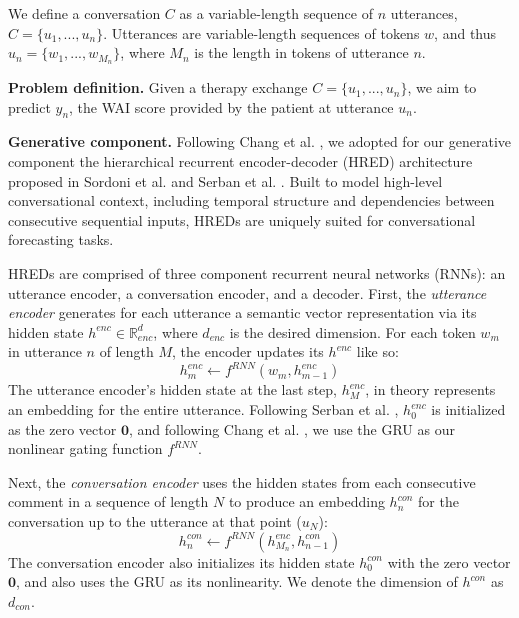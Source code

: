 \documentclass{article}
\begin{document}

We define a conversation $C$ as a variable-length sequence of $n$ utterances, $C=\{u_1,...,u_n\}$. Utterances are variable-length sequences of tokens $w$, and thus $u_n=\{w_1,...,w_{M_n}\}$, where $M_n$ is the length in tokens of utterance $n$.

\textbf{Problem definition.} Given a therapy exchange $C=\{u_1,...,u_n\}$, we aim to predict $y_n$, the WAI score provided by the patient at utterance $u_n$.




\textbf{Generative component.} Following Chang et al. \citeyear{Chang-Trouble:19}, we adopted for our generative component the hierarchical recurrent encoder-decoder (HRED) architecture proposed in Sordoni et al. \citeyear{sordoni2015hierarchical} and Serban et al. \citeyear{serban2016building}. Built to model high-level conversational context, including temporal structure and dependencies between consecutive sequential inputs, HREDs are uniquely suited for conversational forecasting tasks. 

HREDs are comprised of three component recurrent neural networks (RNNs): an utterance encoder, a conversation encoder, and a decoder. First, the \textit{utterance encoder} generates for each utterance a semantic vector representation via its hidden state $h^{enc} \in \mathbb{R}^d_{enc}$, where $d_{enc}$ is the desired dimension. For each token $w_m$ in utterance $n$ of length $M$, the encoder updates its $h^{enc}$ like so:
\begin{equation}
  h^{enc}_m \gets f^{RNN}(w_{m}, h^{enc}_{m-1})
\end{equation}
The utterance encoder's hidden state at the last step, $h^{enc}_{M}$, in theory represents an embedding for the entire utterance. Following Serban et al. \citeyear{serban2016building}, $h^{enc}_{0}$ is initialized as the zero vector $\mathbf{0}$, and following Chang et al. \citeyear{Chang-Trouble:19}, we use the GRU \cite{cho2014learning} as our nonlinear gating function $f^{RNN}$.

Next, the \textit{conversation encoder} uses the hidden states from each consecutive comment in a sequence of length $N$ to produce an embedding $h^{con}_n$ for the conversation up to the utterance at that point ($u_N$):
\begin{equation}
  h^{con}_n \gets f^{RNN}(h^{enc}_{M_n}, h^{con}_{n-1})
\end{equation}
The conversation encoder also initializes its hidden state $h^{con}_0$ with the zero vector $\mathbf{0}$, and also uses the GRU as its nonlinearity. We denote the dimension of $h^{con}$ as $d_{con}$.
\end{document}
